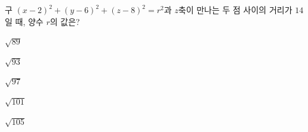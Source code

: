 구 $(x-2)^2+(y-6)^2+(z-8)^2=r^2$과 $z$축이 만나는 두 점 사이의 거리가 $14$일 때, 양수 $r$의 값은?
\begin{choices32}{\rule[-3ex]{0pt}{8ex}$\sqrt{89}$}{\rule[-3ex]{0pt}{8ex}$\sqrt{93}$}{\rule[-3ex]{0pt}{8ex}$\sqrt{97}$}{\rule[-3ex]{0pt}{8ex}$\sqrt{101}$}{\rule[-3ex]{0pt}{8ex}$\sqrt{105}$}\end{choices32}
